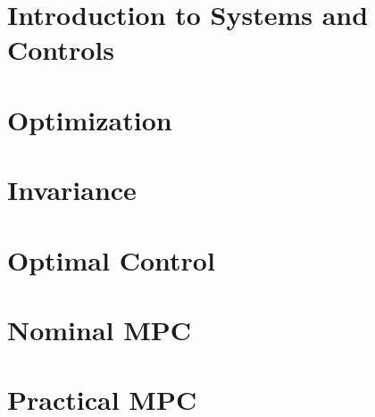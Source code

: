 \documentclass[layout=preview,secnumdepth=2,tight]{sst-custom}
\begin{document}
\iftoggle{do-multicol}{ \begin{multicols*}{\numcolumns}}{}
		
		\iftoggle{use-small-font}{\footnotesize}{}
		\renewcommand{\contentsname}{}
		\vspace{-5mm}
		\begin{spacing}{0.9}
			\tableofcontents
		\end{spacing}
		
		\section{Introduction to Systems and Controls}
		
		
		\section{Optimization}
		
		\section{Invariance}
		
		
		\section{Optimal Control}
		
		\section{Nominal MPC}
		
		\section{Practical MPC}
		
\end{document}

